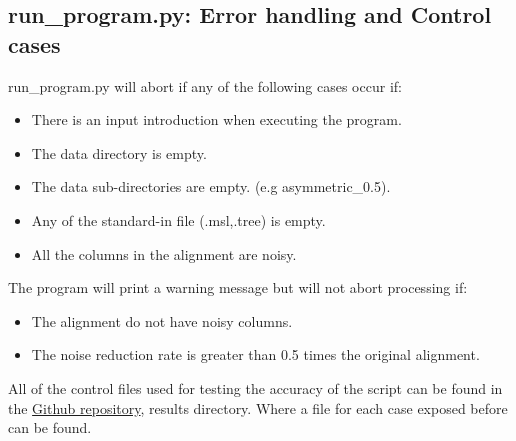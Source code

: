 \documentclass[12pt]{article}
\begin{document}
\subsection{run\_program.py: Error handling and Control cases }

run\_program.py will abort if any of the following cases occur if:
\begin{itemize}
	\item There is an input introduction when executing the program.
	\item The data directory is empty.
	\item The data sub-directories are empty. (e.g asymmetric\_0.5).
	\item Any of the standard-in file (.msl,.tree) is empty.
	\item All the columns in the alignment are noisy. 
\end{itemize}
The program will  print a warning message but will not abort processing if:
\begin{itemize}
	\item The alignment do not have noisy columns.
	\item The noise reduction rate is greater than 0.5 times the original alignment.
\end{itemize}

All of the control files used for testing the accuracy of the script can be found in the  \href{https://github.com/msarrias/protein_multial_noise_reduction/tree/master/results/control_case_data}{Github repository}, results directory. Where a file for each case exposed before can be found.
\end{document}
